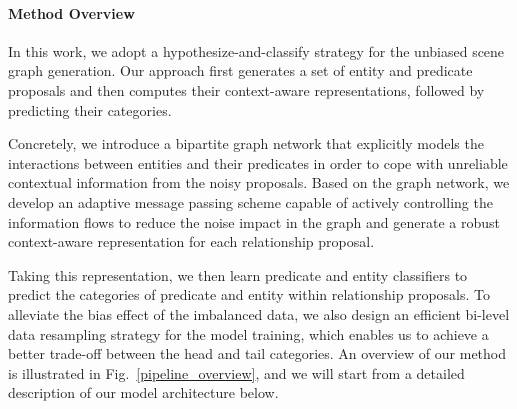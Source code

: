 %
\vspace{-4mm}
\paragraph{Method Overview}
In this work, we adopt a hypothesize-and-classify strategy for the unbiased scene graph generation. Our approach first generates a set of entity and predicate proposals and then computes their context-aware representations, followed by predicting their categories.

Concretely, we introduce a bipartite graph network that explicitly models the interactions between entities and their predicates in order to cope with unreliable contextual information from the noisy proposals. Based on the graph network, we develop an adaptive message passing scheme capable of actively controlling the information flows to reduce the noise impact in the graph and generate a robust context-aware representation for each relationship proposal.  


Taking this representation, we then learn predicate and entity classifiers to predict the categories of predicate and entity within relationship proposals.
To alleviate the bias effect of the imbalanced data, we also design an efficient bi-level data resampling strategy for the model training, which enables us to achieve a better trade-off between the head and tail categories.
An overview of our method is illustrated in Fig.~\ref{pipeline_overview}, and we will start from a detailed description of our model architecture below.  


 
